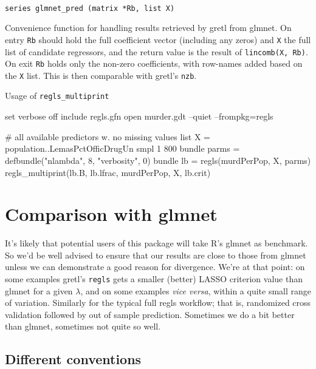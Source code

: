 \documentclass{article}
\newcommand{\startappendices}{%
\newcounter{appcount}
\setcounter{appcount}{0}
\renewcommand{\thesection}{Appendix \Alph{appcount}}}
\newcommand{\myappendix}[1]{%
\addtocounter{appcount}{1}
\section{#1}}
\newenvironment{funcdoc}
{\noindent\hrulefill\\[-12pt]}
{\medbreak}
\begin{document}
\begin{funcdoc}
\begin{verbatim}
series glmnet_pred (matrix *Rb, list X)
\end{verbatim}
  Convenience function for handling results retrieved by gretl from
  \textsf{glmnet}. On entry \texttt{Rb} should hold the full
  coefficient vector (including any zeros) and \texttt{X} the full
  list of candidate regressors, and the return value is the result of
  \texttt{lincomb(X, Rb)}. On exit \texttt{Rb} holds only the non-zero
  coefficients, with row-names added based on the \texttt{X}
  list. This is then comparable with gretl's \texttt{nzb}.
\end{funcdoc}

\begin{script}
  \caption{Usage of \texttt{regls\_multiprint}}
  \label{script:multiprint}
\begin{scode}
set verbose off
include regls.gfn
open murder.gdt --quiet --frompkg=regls

# all available predictors w. no missing values
list X = population..LemasPctOfficDrugUn
smpl 1 800
bundle parms = defbundle("nlambda", 8, "verbosity", 0)
bundle lb = regls(murdPerPop, X, parms)
regls_multiprint(lb.B, lb.lfrac, murdPerPop, X, lb.crit)
\end{scode}
  \end{script}




\clearpage
\startappendices

\myappendix{Comparison with glmnet}
\label{sec:comparison}

It's likely that potential users of this package will take
\textsf{R}'s \textsf{glmnet} as benchmark. So we'd be well advised to
ensure that our results are close to those from \textsf{glmnet} unless
we can demonstrate a good reason for divergence. We're at that point:
on some examples gretl's \texttt{regls} gets a smaller (better) LASSO
criterion value than \textsf{glmnet} for a given $\lambda$, and on
some examples \textit{vice versa}, within a quite small range of
variation. Similarly for the typical full \textsf{regls} workflow;
that is, randomized cross validation followed by out of sample
prediction. Sometimes we do a bit better than \textsf{glmnet},
sometimes not quite so well.

\subsection*{Different conventions}
\end{document}

